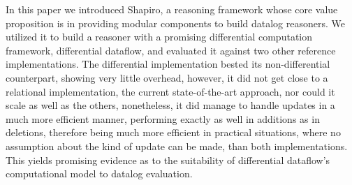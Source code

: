 \documentclass[manuscript,screen,review]{acmart}
\theoremstyle{definition}
\begin{document}
In this paper we introduced Shapiro, a reasoning framework whose core value proposition is in providing modular components to build datalog reasoners. We utilized it to build a reasoner with a promising differential computation framework, differential dataflow, and evaluated it against two other reference implementations. The differential implementation bested its non-differential counterpart, showing very little overhead, however, it did not get close to a relational implementation, the current state-of-the-art approach, nor could it scale as well as the others, nonetheless, it did manage to handle updates in a much more efficient manner, performing exactly as well in additions as in deletions, therefore being much more efficient in practical situations, where no assumption about the kind of update can be made, than both implementations. This yields promising evidence as to the suitability of differential dataflow's computational model to datalog evaluation.



\end{document}
